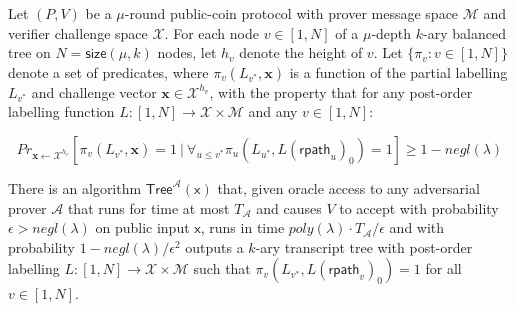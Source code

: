  \begin{lemma}
 Let $(P, V)$ be a $\mu$-round public-coin protocol with prover message space $\mathcal{M}$ and verifier challenge space $\mathcal{X}$. For each node $v \in [1,N]$ of a $\mu$-depth $k$-ary balanced tree on $N = \textsf{size}(\mu, k)$ nodes, let $h_v$ denote the height of $v$. Let $\{\pi_v: v \in [1,N]\}$ denote a set of predicates, where $\pi_v(L_{v^*}, \mathbf{x})$ is a function of the partial labelling $L_{v^*}$ and challenge vector $\mathbf{x} \in \mathcal{X}^{h_v}$, with the property that for any post-order labelling function $L:[1,N] \rightarrow \mathcal{X} \times \mathcal{M}$ and any $v \in [1,N]$: 

$$Pr_{\mathbf{x} \leftarrow \mathcal{X}^{h_v}}[ \pi_v(L_{v^*}, \mathbf{x}) = 1 \ | \ \forall_{u \leq v^*} \pi_u(L_{u^*},L(\textsf{rpath}_u)_0) = 1] \geq 1 - negl(\lambda)$$

There is an algorithm $\textsf{Tree}^\mathcal{A}(\mathsf{x})$ that, given oracle access to any adversarial prover $\mathcal{A}$ that runs for time at most $T_\mathcal{A}$ and causes $V$ to accept with probability $\epsilon > negl(\lambda)$ on public input $\mathsf{x}$, runs in time $poly(\lambda)\cdot T_\mathcal{A}/\epsilon$ and with probability $1 - negl(\lambda)/\epsilon^2$ outputs a $k$-ary transcript tree with post-order labelling $L:[1,N] \rightarrow \mathcal{X}\times \mathcal{M}$ such that $\pi_v(L_{v^*}, L(\textsf{rpath}_v)_0) = 1$ for all $v \in [1,N]$.  	
 \end{lemma}



